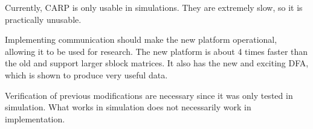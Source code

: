 

Currently, CARP is only usable in simulations.
They are extremely slow, so it is practically unusable.

Implementing communication should make the new platform operational, allowing it to be used for research.
The new platform is about 4 times faster than the old and support larger sblock matrices.
It also has the new and exciting DFA, which is shown to produce very useful data.

Verification of previous modifications are necessary since it was only tested in simulation.
What works in simulation does not necessarily work in implementation.

